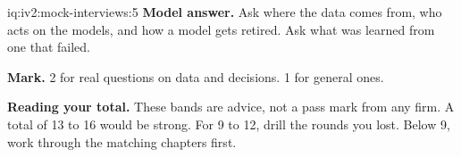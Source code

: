 \begin{solution}{iq:iv2:mock-interviews:5}
\ivstop
\textbf{Model answer.} Ask where the data comes from, who acts on the models, and how a model gets retired. Ask what was learned from one that failed.

\textbf{Mark.} 2 for real questions on data and decisions. 1 for general ones.

\medskip
\textbf{Reading your total.} These bands are advice, not a pass mark from any firm. A total of 13 to 16 would be strong. For 9 to 12, drill the rounds you lost. Below 9, work through the matching chapters first.

\end{solution}

